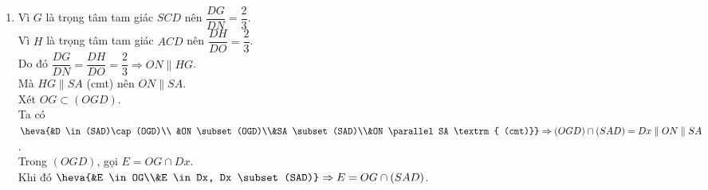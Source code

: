 \begin{bt}
{\begin{enumerate}
			Vì $G$ là trọng tâm tam giác $SCD$ nên $\dfrac{MG}{MS} = \dfrac{1}{3}$.\\
			Mặt khác, ta có $H$ là trọng tâm tam giác $ACD$ suy ra $\dfrac{MH}{MA} = \dfrac{1}{3}$.\\
			Do đó $\dfrac{MG}{MS} = \dfrac{MH}{MA} = \dfrac{1}{3} \Rightarrow HG \parallel SA$.
			\item Vì $G$ là trọng tâm tam giác $SCD$ nên $\dfrac{DG}{DN} = \dfrac{2}{3}$.\\
			Vì $H$ là trọng tâm tam giác $ACD$ nên $\dfrac{DH}{DO} = \dfrac{2}{3}$.\\
			Do đó $\dfrac{DG}{DN} = \dfrac{DH}{DO} = \dfrac{2}{3} \Rightarrow ON \parallel HG$.\\
			Mà $HG \parallel SA$ (cmt) nên $ON \parallel SA$.\\
			Xét $OG \subset (OGD)$.\\
			Ta có $\heva{&D \in (SAD)\cap (OGD)\\
			&ON \subset (OGD)\\&SA \subset (SAD)\\&ON \parallel SA \textrm{ (cmt)}} \Rightarrow (OGD)\cap (SAD) = Dx\parallel ON\parallel SA$.\\
			Trong $(OGD)$, gọi $E = OG \cap Dx$.\\
			Khi đó $\heva{&E \in OG\\&E \in Dx, Dx \subset (SAD)} \Rightarrow E = OG \cap (SAD)$.
		\end{enumerate}
	}
\end{bt}

